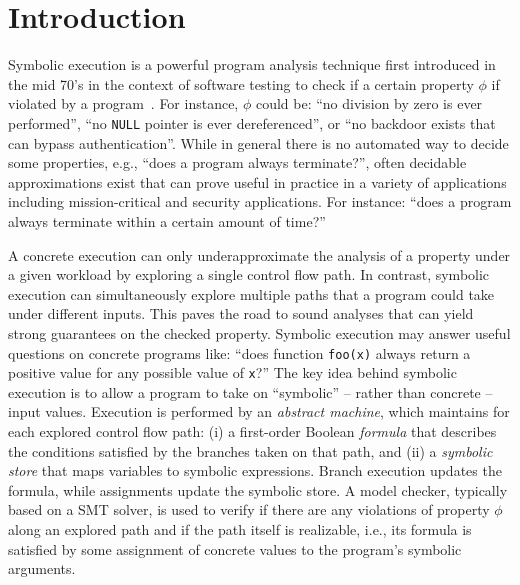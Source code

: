 
\section{Introduction}

Symbolic execution is a powerful program analysis technique first introduced in the mid 70's in the context of software testing to check if a certain property $\phi$ if violated by a program~\cite{K-CACM76,H-TSE77}. For instance, $\phi$ could be: ``no division by zero is ever performed'', ``no {\tt NULL} pointer is ever dereferenced'', or ``no backdoor exists that can bypass authentication''. While in general there is no automated way to decide some properties, e.g., ``does a program always terminate?'', often decidable approximations exist that can prove useful in practice in a variety of applications including mission-critical and security applications. For instance: ``does a program always terminate within a certain amount of time?''

A concrete execution can only underapproximate the analysis of a property under a given workload by exploring a single control flow path. In contrast, symbolic execution can simultaneously explore multiple paths that a program could take under different inputs. This paves the road to sound analyses that can yield strong guarantees on the checked property. Symbolic execution may answer useful questions on concrete programs like: ``does function {\tt foo(x)} always return a positive value for any possible value of {\tt x}?'' The key idea behind symbolic execution is to allow a program to take on ``symbolic'' -- rather than concrete -- input values. Execution is performed by an {\em abstract machine}, which maintains for each explored control flow path: (i) a first-order Boolean {\em formula} that describes the conditions satisfied by the branches taken on that path, and (ii) a {\em symbolic store} that maps variables to symbolic expressions. Branch execution updates the formula, while assignments update the symbolic store. A model checker, typically based on a SMT solver, is used to verify if there are any violations of property $\phi$ along an explored path and if the path itself is realizable, i.e., its formula is satisfied by some assignment of concrete values to the program's symbolic arguments.


